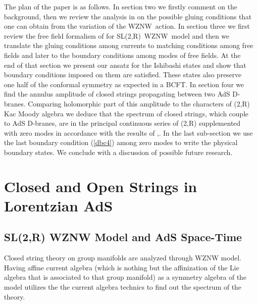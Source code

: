 \documentclass[a4paper,12pt]{article}
\begin{document}
The plan of the paper is as follows. In section two we firstly comment on
the background, then we review the analysis in \cite{lomholt} on the
possible gluing conditions that one can obtain from the variation of the
WZNW\ action. In section three we first review the free field formalism of
\cite{bars1} for SL(2,R)\ WZNW\ model and then we translate the gluing
conditions among currents to matching conditions among free fields and later
to the boundary conditions among modes of free fields. At the end of that
section we present our ansatz for the Ishibashi states and show that
boundary conditions imposed on them are satisfied. These states also
preserve one half of the conformal symmetry as expected in a BCFT. In
section four we find the annulus amplitude of closed strings propagating
between two AdS\coordHE{} D-branes. Comparing holomorphic part of this amplitude
to the characters of \coordHE{}(2,R) Kac Moody algebra we
deduce that the spectrum of closed strings, which couple to AdS\coordHE{}
D-branes, are in the principal continuous series of \coordHE{}%
(2,R) supplemented with zero modes in accordance with the results of \cite
{bars1},\cite{BDM}. In the last sub-section we use the last boundary
condition (\ref{dbc4}) among zero modes to write the physical boundary
states. We conclude with a discussion of possible future research.

\section{Closed and Open Strings in Lorentzian AdS\coordHE{}}

\subsection{SL(2,R) WZNW Model and AdS\coordHE{} Space-Time}

Closed string theory on group manifolds are analyzed through WZNW model.
Having affine current algebra (which is nothing but the affinization of the
Lie algebra that is associated to that group manifold) as a symmetry algebra
of the model utilizes the the current algebra technics to find out the
spectrum of the theory.
\end{document}
